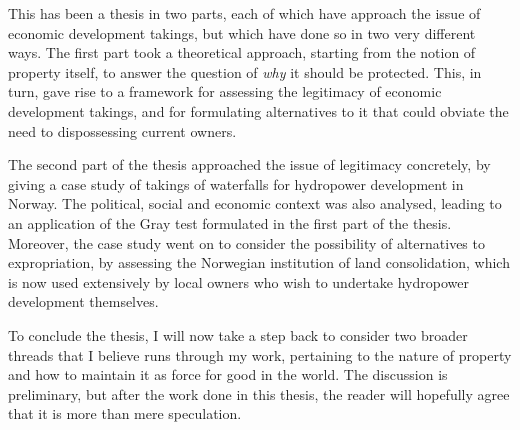 This has been a thesis in two parts, each of which have approach the issue of economic development takings, but which have done so in two very different ways. The first part took a theoretical approach, starting from the notion of property itself, to answer the question of {\it why} it should be protected. This, in turn, gave rise to a framework for assessing the legitimacy of economic development takings, and for formulating alternatives to it that could obviate the need to dispossessing current owners.

The second part of the thesis approached the issue of legitimacy concretely, by giving a case study of takings of waterfalls for hydropower development in Norway. The political, social and economic context was also analysed, leading to an application of the Gray test formulated in the first part of the thesis. Moreover, the case study went on to consider the possibility of alternatives to expropriation, by assessing the Norwegian institution of land consolidation, which is now used extensively by local owners who wish to undertake hydropower development themselves.




To conclude the thesis, I will now take a step back to consider two broader threads that I believe runs through my work, pertaining to the nature of property and how to maintain it as force for good in the world. The discussion is preliminary, but after the work done in this thesis, the reader will hopefully agree that it is more than mere speculation.

